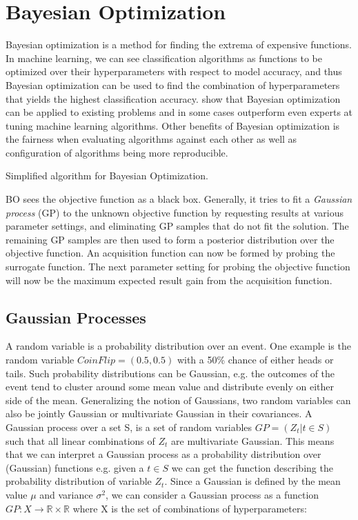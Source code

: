 \section{Bayesian Optimization}\label{sec:bayesian-optimization}
Bayesian optimization is a method for finding the extrema of expensive functions. In machine learning, we can see classification algorithms as functions to be optimized over their hyperparameters with respect to model accuracy, and thus Bayesian optimization can be used to find the combination of hyperparameters that yields the highest classification accuracy. \citet{snoek2012practical} show that Bayesian optimization can be applied to existing problems and in some cases outperform even experts at tuning machine learning algorithms. Other benefits of Bayesian optimization is the fairness when evaluating algorithms against each other as well as configuration of algorithms being more reproducible.
\begin{algorithm*}
	\caption{Simplified algorithm for Bayesian Optimization.}
	\label{alg:bayesian-optimization}
\end{algorithm*}

BO sees the objective function as a black box. Generally, it tries to fit a \emph{Gaussian process} (GP) to the unknown objective function by requesting results at various parameter settings, and eliminating GP samples that do not fit the solution. The remaining GP samples are then used to form a posterior distribution over the objective function. An acquisition function can now be formed by probing the surrogate function. The next parameter setting for probing the objective function will now be the maximum expected result gain from the acquisition function.

\subsection{Gaussian Processes}
A random variable is a probability distribution over an event. One example is the random variable $CoinFlip = (0.5, 0.5)$ with a 50\% chance of either heads or tails. Such probability distributions can be Gaussian, e.g. the outcomes of the event tend to cluster around some mean value and distribute evenly on either side of the mean. Generalizing the notion of Gaussians, two random variables can also be jointly Gaussian or multivariate Gaussian in their covariances. A Gaussian process over a set S, is a set of random variables $GP = (Z_t | t \in S)$ such that all linear combinations of $Z_t$ are multivariate Gaussian. This means that we can interpret a Gaussian process as a probability distribution over (Gaussian) functions e.g. given a $t \in S$ we can get the function describing the probability distribution of variable $Z_t$. Since a Gaussian is defined by the mean value $\mu$ and variance $\sigma^2$, we can consider a Gaussian process as a function $GP : X \rightarrow \mathbb{R} \times \mathbb{R}$ where X is the set of combinations of hyperparameters:

